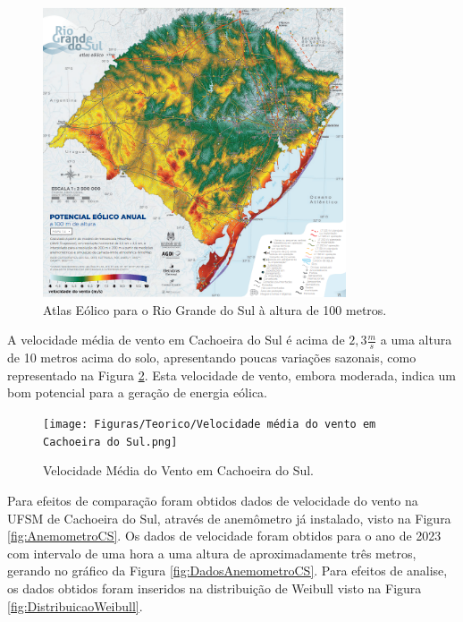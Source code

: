 \begin{figure}[H]
    \caption{Atlas Eólico para o Rio Grande do Sul à altura de 100 metros.}
    \label{fig:Atlas_RS}
    \centering
    \includegraphics[width=0.8\textwidth]{Figuras/Teorico/Atlas RS.png}
\end{figure}

\par A velocidade média de vento em Cachoeira do Sul é acima de $2,3\frac{m}{s}$ a uma altura de 10 metros acima do solo, apresentando poucas variações sazonais, como representado na Figura \ref{fig:VelocidadeEMCachoeiraDoSul}. Esta velocidade de vento, embora moderada, indica um bom potencial para a geração de energia eólica.


\begin{figure}[H]
    \caption{Velocidade Média do Vento em Cachoeira do Sul.}      
    \label{fig:VelocidadeEMCachoeiraDoSul}
    \centering
    \texttt{[image: Figuras/Teorico/Velocidade média do vento em Cachoeira do Sul.png]}
\end{figure}

\par Para efeitos de comparação foram obtidos dados de velocidade do vento na UFSM de Cachoeira do Sul, através de anemômetro já instalado, visto na Figura \ref{fig:AnemometroCS}. Os dados de velocidade foram obtidos para o ano de 2023 com intervalo de uma hora a uma altura de aproximadamente três metros, gerando no gráfico da Figura \ref{fig:DadosAnemometroCS}. Para efeitos de analise, os dados obtidos foram inseridos na distribuição de Weibull visto na Figura \ref{fig:DistribuicaoWeibull}. 

